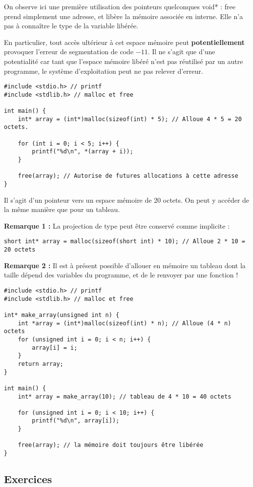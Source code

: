 \documentclass[../../../main.tex]{subfiles}
\begin{document}
On observe ici une première utilisation des pointeurs quelconques \textsf{void*} : \textsf{free} prend simplement une adresse, et libère la mémoire associée en interne. Elle n'a pas à connaître le type de la variable libérée.
 
En particulier, tout accès ultérieur à cet espace mémoire peut \textbf{potentiellement} provoquer l'erreur de segmentation de code $-11$. Il ne s'agit que d'une potentialité car tant que l'espace mémoire libéré n'est pas réutilisé par un autre programme, le système d'exploitation peut ne pas relever d'erreur.
\begin{verbatim}
#include <stdio.h> // printf
#include <stdlib.h> // malloc et free

int main() {
	int* array = (int*)malloc(sizeof(int) * 5); // Alloue 4 * 5 = 20 octets.

	for (int i = 0; i < 5; i++) {
		printf("%d\n", *(array + i));
	}

	free(array); // Autorise de futures allocations à cette adresse
}
\end{verbatim}
Il s'agit d'un pointeur vers un espace mémoire de 20 octets. On peut y accéder de la même manière que pour un tableau.
 
\textbf{Remarque 1 :} La projection de type peut être conservé comme implicite :
\begin{verbatim}
short int* array = malloc(sizeof(short int) * 10); // Alloue 2 * 10 = 20 octets
\end{verbatim}
\textbf{Remarque 2 :} Il est à présent possible d'allouer en mémoire un tableau dont la taille dépend des variables du programme, et de le renvoyer par une fonction !
\begin{verbatim}
#include <stdio.h> // printf
#include <stdlib.h> // malloc et free

int* make_array(unsigned int n) {
	int *array = (int*)malloc(sizeof(int) * n); // Alloue (4 * n) octets
	for (unsigned int i = 0; i < n; i++) {
		array[i] = i;
	}
	return array;
}

int main() {
	int* array = make_array(10); //	tableau de 4 * 10 = 40 octets

	for (unsigned int i = 0; i < 10; i++) {
		printf("%d\n", array[i]);
	}

	free(array); // la mémoire doit toujours être libérée
}
\end{verbatim}
\subsection{Exercices}
\end{document}
